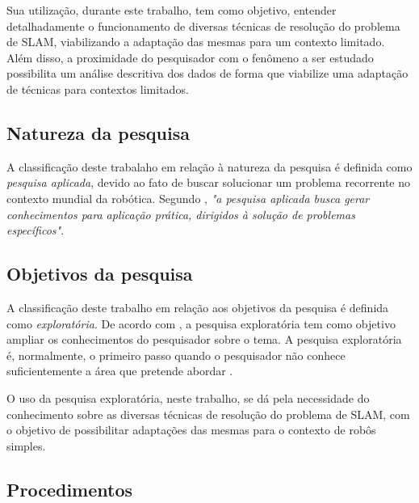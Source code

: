 		Sua utilização, durante este trabalho, tem como objetivo, entender detalhadamente o funcionamento de diversas técnicas de resolução do problema de SLAM, viabilizando a adaptação das mesmas para um contexto limitado. Além disso, a proximidade do pesquisador com o fenômeno a ser estudado possibilita um análise descritiva dos dados de forma que viabilize uma adaptação de técnicas para contextos limitados.
		

		\subsection{Natureza da pesquisa} %
		\label{sub:natureza_da_pesquisa}
		
			A classificação deste trabalaho em relação à natureza da pesquisa é definida como \textit{pesquisa aplicada}, devido ao fato de buscar solucionar um problema recorrente no contexto mundial da robótica. Segundo \cite{metodologia}, \textit{"a pesquisa aplicada busca gerar conhecimentos para aplicação prática, dirigidos à solução de problemas específicos"}.

		\subsection{Objetivos da pesquisa} %
		\label{sec:classificação_quanto_aos_objetivos_da_pesquisa}
			
			A classificação deste trabalho em relação aos objetivos da pesquisa é definida como \textit{exploratória}. De acordo com \cite{metodologiaCientifica}, a pesquisa exploratória tem como objetivo ampliar os conhecimentos do pesquisador sobre o tema. A pesquisa exploratória é, normalmente, o primeiro passo quando o pesquisador não conhece suficientemente a área que pretende abordar \cite{metodologiaDaPesquisa}.

			O uso da pesquisa exploratória, neste trabalho, se dá pela necessidade do conhecimento sobre as diversas técnicas de resolução do problema de SLAM, com o objetivo de possibilitar adaptações das mesmas para o contexto de robôs simples.

		\subsection{Procedimentos} %
		\label{sub:procedimentos}

